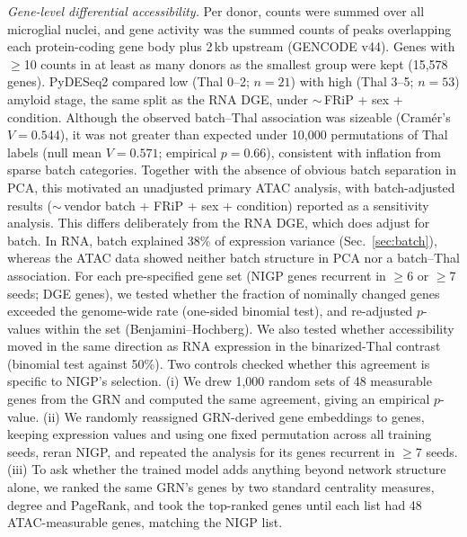 \documentclass[10pt,twocolumn,letterpaper]{article}
\makeatletter
\renewcommand\section{\@startsection{section}{1}{\z@}{-1.6ex plus -.4ex minus -.2ex}{0.8ex plus .2ex}{\normalfont\large\bfseries}}
\makeatother
\begin{document}
\emph{Gene-level differential accessibility.} Per donor, counts were summed over all microglial nuclei, and gene activity was the summed counts of peaks overlapping each protein-coding gene body plus 2\,kb upstream (GENCODE v44). Genes with $\geq$10 counts in at least as many donors as the smallest group were kept (15,578 genes). PyDESeq2 compared low (Thal 0--2; $n=21$) with high (Thal 3--5; $n=53$) amyloid stage, the same split as the RNA DGE, under $\sim$\,FRiP + sex + condition. Although the observed batch--Thal association was sizeable (Cram\'er's $V=0.544$), it was not greater than expected under 10,000 permutations of Thal labels (null mean $V=0.571$; empirical $p=0.66$), consistent with inflation from sparse batch categories. Together with the absence of obvious batch separation in PCA, this motivated an unadjusted primary ATAC analysis, with batch-adjusted results ($\sim$\,vendor batch + FRiP + sex + condition) reported as a sensitivity analysis. This differs deliberately from the RNA DGE, which does adjust for batch. In RNA, batch explained 38\% of expression variance (Sec.~\ref{sec:batch}), whereas the ATAC data showed neither batch structure in PCA nor a batch--Thal association. For each pre-specified gene set (NIGP genes recurrent in $\geq$6 or $\geq$7 seeds; DGE genes), we tested whether the fraction of nominally changed genes exceeded the genome-wide rate (one-sided binomial test), and re-adjusted $p$-values within the set (Benjamini--Hochberg). We also tested whether accessibility moved in the same direction as RNA expression in the binarized-Thal contrast (binomial test against 50\%). Two controls checked whether this agreement is specific to NIGP's selection. (i) We drew 1,000 random sets of 48 measurable genes from the GRN and computed the same agreement, giving an empirical $p$-value. (ii) We randomly reassigned GRN-derived gene embeddings to genes, keeping expression values and using one fixed permutation across all training seeds, reran NIGP, and repeated the analysis for its genes recurrent in $\geq$7 seeds. (iii) To ask whether the trained model adds anything beyond network structure alone, we ranked the same GRN's genes by two standard centrality measures, degree and PageRank, and took the top-ranked genes until each list had 48 ATAC-measurable genes, matching the NIGP list.


\section{Results}
\end{document}
